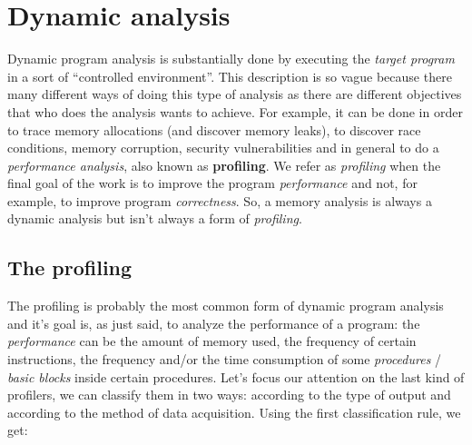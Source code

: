 \documentclass[a4paper,11pt]{report}
\begin{document}
\section{Dynamic analysis}

Dynamic program analysis is substantially done by executing the \emph{target
program} in a sort of ``controlled environment''.
This description is so vague because there many different ways of doing
this type of analysis as there are different objectives that who does the
analysis wants to achieve. For example, it can be done in order to trace memory
allocations (and discover memory leaks), to discover race conditions, memory
corruption, security vulnerabilities and in general to do a \emph{performance
analysis}, also known as \textbf{profiling}. We refer as \emph{profiling} when
the final goal of the work is to improve the program  \emph{performance} and
not, for example, to improve program \emph{correctness}. So, a memory analysis
is always a dynamic analysis but isn't always a form of \emph{profiling}.

\subsection{The profiling}
The profiling is probably the most common form of dynamic program analysis and
it's goal is, as just said, to analyze the performance of a program: the
\emph{performance} can be the amount of memory used, the frequency of certain
instructions, the frequency and/or the time consumption of some
\emph{procedures} / \emph{basic blocks} inside certain procedures. Let's focus
our attention on the last kind of profilers, we can classify them in two ways:
according to the type of output and according to the method of data acquisition.
Using the first classification rule, we get:
\end{document}
